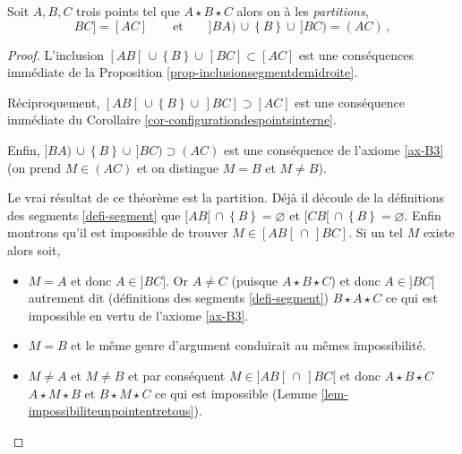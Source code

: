 \begin{thm}\label{th-partitionsemgmendroite}
    Soit $A,B,C$ trois points tel que $A\star B \star C$ alors on à les \emph{partitions},
    \begin{equation*}
        [AB[\,\cup \left\{B\right\}\cup\, ]BC] = [AC] \qquad \text{et} \qquad ]BA)\,\cup \left\{B\right\}\cup\, ]BC) = (AC) \,,
    \end{equation*}
    \begin{proof}
        L'inclusion $[AB[\,\cup \left\{B\right\}\cup\, ]BC] \subset [AC]$  est une conséquences immédiate de la Proposition \ref{prop-inclusionsegmentdemidroite}.

        Réciproquement, $[AB[\,\cup \left\{B\right\}\cup\, ]BC] \supset [AC]$ est une conséquence immédiate du Corollaire \ref{cor-configurationdespointsinterne}. 

        Enfin, $]BA)\,\cup \left\{B\right\}\cup\, ]BC) \supset (AC) $ est une conséquence de l'axiome \ref{ax-B3} (on prend $M\in (AC)$ et on distingue $M=B$ et $M\neq B$).

        Le vrai résultat de ce théorème est la partition. Déjà il découle de la définitions des segments \ref{defi-segment}  que $[AB[\,\cap \left\{B\right\}=\varnothing$ et $[CB[\,\cap \left\{B\right\}=\varnothing$. Enfin montrons qu'il est impossible de trouver $M \in [AB[\,\cap\, ]BC]$. Si un tel $M$ existe alors soit,
        \begin{itemize}[$\bullet$]
            \item $M=A$ et donc $A\in]BC]$. Or $A\neq C$ (puisque $A\star B \star C$) et donc $A\in ]BC[$ autrement dit (définitions des segments \ref{defi-segment}) $B\star A \star C$ ce qui est impossible en vertu de l'axiome \ref{ax-B3}.
            \item $M=B$ et le même genre d'argument conduirait au mêmes impossibilité.
            \item $M\neq A$ et $M\neq B$ et par conséquent $M\in ]AB[\,\cap\, ]BC[$ et donc $A \star B\star C$ $A \star M \star B$ et $B \star M \star C$ ce qui est impossible (Lemme \ref{lem-impossibiliteunpointentretous}).
        \end{itemize}


\end{proof}
\end{thm}
